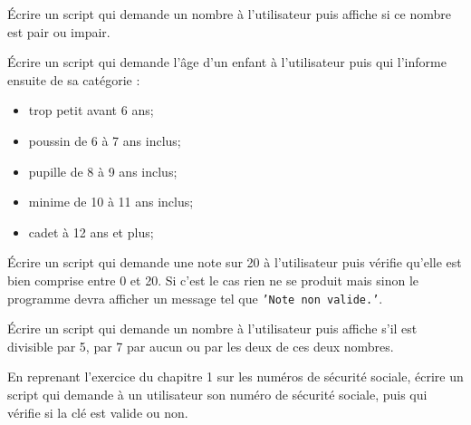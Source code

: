 \begin{exercice}[]
	\'Ecrire un script qui demande un nombre à l'utilisateur puis affiche si ce nombre est pair ou impair.
\end{exercice}
\begin{exercice}
	\'Ecrire un script qui demande l'âge d'un enfant à l'utilisateur puis qui l'informe ensuite de sa catégorie :
	\begin{itemize}
		\item   trop petit avant 6 ans;
		\item   poussin de 6 à 7 ans inclus;
		\item   pupille de 8 à 9 ans inclus;
		\item   minime de 10 à 11 ans inclus;
		\item   cadet à 12 ans et plus;
	\end{itemize}
\end{exercice}

\begin{exercice}
	\'Ecrire un script qui demande une note sur 20 à l'utilisateur puis vérifie qu'elle est bien comprise entre 0 et 20. Si c'est le cas rien ne se produit mais sinon le programme devra afficher un message tel que \texttt{'Note non valide.'}.
\end{exercice}

\begin{exercice}
	\'Ecrire un script qui demande un nombre à l'utilisateur puis affiche s'il est divisible par 5, par 7 par aucun ou par les deux de ces deux nombres.
\end{exercice}
\begin{exercice}
	En reprenant l'exercice du chapitre 1 sur les numéros de sécurité sociale, écrire un script qui demande à un utilisateur son numéro de sécurité sociale, puis qui vérifie si la clé est valide ou non.
\end{exercice}


